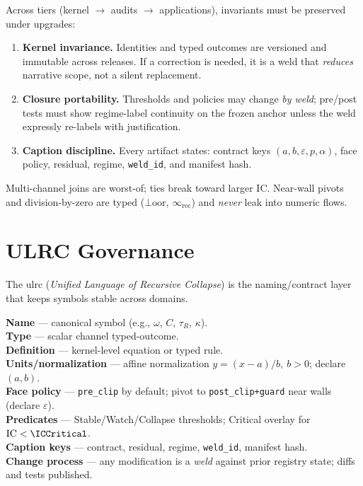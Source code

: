 \begin{definition}
Across tiers (kernel \(\rightarrow\) audits \(\rightarrow\) applications), invariants must be preserved under upgrades:
\begin{enumerate}[leftmargin=1.25em]
  \item \textbf{Kernel invariance.} Identities and typed outcomes are versioned and immutable across releases. If a correction is needed, it is a weld that \emph{reduces} narrative scope, not a silent replacement.
  \item \textbf{Closure portability.} Thresholds and policies may change \emph{by weld}; pre/post tests must show regime-label continuity on the frozen anchor unless the weld expressly re-labels with justification.
  \item \textbf{Caption discipline.} Every artifact states: contract keys \((a,b,\varepsilon,p,\alpha)\), face policy, residual, regime, \texttt{weld\_id}, and manifest hash.
\end{enumerate}
\end{definition}

\begin{remark}
Multi-channel joins are worst-of; ties break toward larger \(\mathrm{IC}\). Near-wall pivots and division-by-zero are typed (\(\bot\!\mathrm{oor}\), \(\infty_{\mathrm{rec}}\)) and \emph{never} leak into numeric flows.
\end{remark}

\section{ULRC Governance}
\label{sec:ulrc}

The \gls{ulrc} (\emph{Unified Language of Recursive Collapse}) is the naming/contract layer that keeps symbols stable across domains.

\begin{eqbox}
\textbf{Name} — canonical symbol (e.g., \(\omega\), \(C\), \(\tau_R\), \(\kappa\)).\\
\textbf{Type} — scalar \textbar{} channel \textbar{} typed-outcome.\\
\textbf{Definition} — kernel-level equation or typed rule.\\
\textbf{Units/normalization} — affine normalization \(y=(x-a)/b,\ b>0\); declare \((a,b)\).\\
\textbf{Face policy} — \texttt{pre\_clip} by default; pivot to \texttt{post\_clip+guard} near walls (declare \(\varepsilon\)).\\
\textbf{Predicates} — Stable/Watch/Collapse thresholds; Critical overlay for \(\mathrm{IC}<\ICCritical\).\\
\textbf{Caption keys} — contract, residual, regime, \texttt{weld\_id}, manifest hash.\\
\textbf{Change process} — any modification is a \emph{weld} against prior registry state; diffs and tests published.
\end{eqbox}

